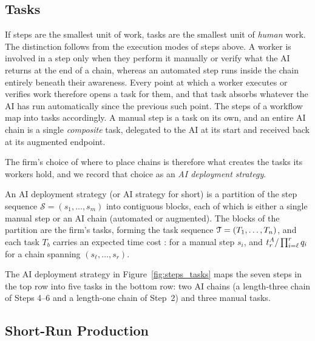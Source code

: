 \subsection{Tasks}
\label{sec:model.tasks}

If steps are the smallest unit of work, tasks are the smallest unit of \emph{human} work.
The distinction follows from the execution modes of steps above. 
A worker is involved in a step only when they perform it manually or verify what the AI returns at the end of a chain, whereas an automated step runs inside the chain entirely beneath their awareness.
Every point at which a worker executes or verifies work therefore opens a task for them, and that task absorbs whatever the AI has run automatically since the previous such point.
The steps of a workflow map into tasks accordingly. A manual step is a task on its own, and an entire AI chain is a single \emph{composite} task, delegated to the AI at its start and received back at its augmented endpoint.

The firm's choice of where to place chains is therefore what creates the tasks its workers hold, and we record that choice as an \emph{AI deployment strategy}.

\begin{definition}
\label{def:ai_strategy}
An AI deployment strategy (or AI strategy for short) is a partition of the step sequence $\mathcal{S}=(s_1,\ldots,s_m)$ into contiguous blocks, each of which is either a single manual step or an AI chain (automated or augmented).
The blocks of the partition are the firm's tasks, forming the task sequence $\mathcal{T} = (T_1, \dotsc, T_n)$, and each task $T_b$ carries an expected time cost :  for a manual step $s_i$, and $t^{A}_{r}/\prod_{i=\ell}^{r} q_i$ for a chain spanning $(s_\ell, \dotsc, s_r)$.
\end{definition}

The AI deployment strategy in Figure~\ref{fig:steps_tasks} maps the seven steps in the top row into five tasks in the bottom row: two AI chains (a length-three chain of Steps 4--6 and a length-one chain of Step~2) and three manual tasks.



\subsection{Short-Run Production}
\label{sec:shortrun.production}


